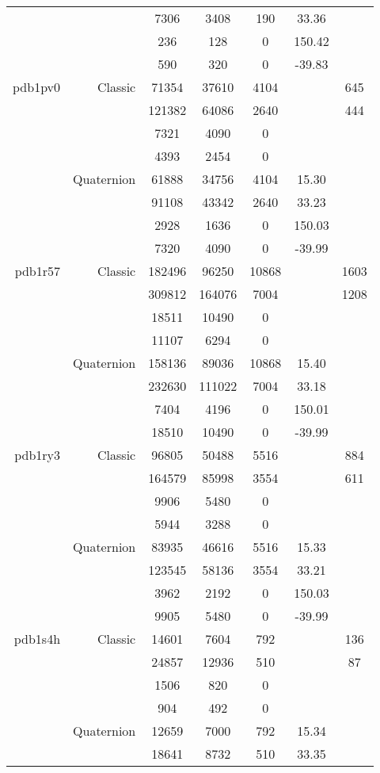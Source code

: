 \begin{xltabular}{\textwidth}{r|rcccSc}
& & 7306 & 3408 & 190 & 33.36 & \\
& & 236 & 128 & 0 & 150.42 & \\
& & 590 & 320 & 0 & -39.83 & \\ \addlinespace
pdb1pv0 & Classic & 71354 & 37610 & 4104 & & 645 \\
& & 121382 & 64086 & 2640 & & 444 \\
& & 7321 & 4090 & 0 & & \\
& & 4393 & 2454 & 0 & & \\
& Quaternion & 61888 & 34756 & 4104 & 15.30 & \\
& & 91108 & 43342 & 2640 & 33.23 & \\
& & 2928 & 1636 & 0 & 150.03 & \\
& & 7320 & 4090 & 0 & -39.99 & \\ \addlinespace
pdb1r57 & Classic & 182496 & 96250 & 10868 & & 1603 \\
& & 309812 & 164076 & 7004 & & 1208 \\
& & 18511 & 10490 & 0 & & \\
& & 11107 & 6294 & 0 & & \\
& Quaternion & 158136 & 89036 & 10868 & 15.40 & \\
& & 232630 & 111022 & 7004 & 33.18 & \\
& & 7404 & 4196 & 0 & 150.01 & \\
& & 18510 & 10490 & 0 & -39.99 & \\ \addlinespace
pdb1ry3 & Classic & 96805 & 50488 & 5516 & & 884 \\
& & 164579 & 85998 & 3554 & & 611 \\
& & 9906 & 5480 & 0 & & \\
& & 5944 & 3288 & 0 & & \\
& Quaternion & 83935 & 46616 & 5516 & 15.33 & \\
& & 123545 & 58136 & 3554 & 33.21 & \\
& & 3962 & 2192 & 0 & 150.03 & \\
& & 9905 & 5480 & 0 & -39.99 & \\ \addlinespace
pdb1s4h & Classic & 14601 & 7604 & 792 & & 136 \\
& & 24857 & 12936 & 510 & & 87 \\
& & 1506 & 820 & 0 & & \\
& & 904 & 492 & 0 & & \\
& Quaternion & 12659 & 7000 & 792 & 15.34 & \\
& & 18641 & 8732 & 510 & 33.35 & \\

\end{xltabular}
